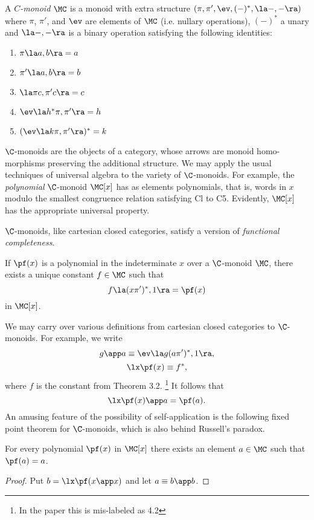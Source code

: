 \begin{defn}
A {\em $C$-monoid} $\MC$ is a monoid with extra structure
$(\pi, \pi', \ev, (-)^*, \la -,- \ra)$ where $\pi$, $\pi'$, and $\ev$ are
elements of $\MC$ (i.e. nullary operations), $(-)^*$ a unary and $\la -,- \ra$ is
a binary operation satisfying the following identities:
\begin{enumerate}[label=C\theenumi.]
\item $\pi\la a,b\ra = a$
\item $\pi'\la a,b\ra = b$
\item $\la \pi c, \pi' c \ra = c$
\item $\ev \la h^*\pi, \pi' \ra = h$
\item $(\ev \la k\pi, \pi' \ra)^* = k$
\end{enumerate}
\end{defn}

$\C$-monoids are the objects of a category, whose arrows are monoid homo-
morphisms preserving the additional structure. We may apply the usual
techniques of universal algebra to the variety of $\C$-monoids. For example, the
{\em polynomial} $\C$-monoid $\MC[x]$ has as elements polynomials, that is, words in $x$
modulo the smallest congruence relation satisfying Cl to C5. Evidently,
$\MC[x]$ has the appropriate universal property.

$\C$-monoids, like cartesian closed categories, satisfy a version of
{\em functional completeness}.

\begin{thm}
If $\pf(x)$ is a polynomial in the indeterminate $x$ over a
$\C$-monoid $\MC$, there exists a unique constant $f\in \MC$ such that
\[
f\la (x\pi')^*, 1 \ra = \pf(x)
\]
in $\MC[x]$.
\end{thm}
We may carry over various definitions from cartesian closed categories
to $\C$-monoids. For example, we write
\[
g\app a \equiv \ev \la g(a \pi')^*,1\ra,
\]
\[
\lx \pf(x) \equiv f^*,
\]
where $f$ is the constant from Theorem 3.2.%
\footnote{In the paper this is mis-labeled as 4.2}
It follows that
\[
\lx \pf(x) \app a = \pf(a).
\]
An amusing feature of the possibility of self-application is the
following fixed point theorem for $\C$-monoids, which is also behind Russell's
paradox.

\begin{prop}
For every polynomial $\pf(x)$ in $\MC[x]$ there exists an
element $a \in \MC$ such that $\pf(a) = a$.
\end{prop}

\begin{proof}
Put $b = \lx \pf(x \app x)$ and let $a \equiv b \app b$.
\end{proof}


